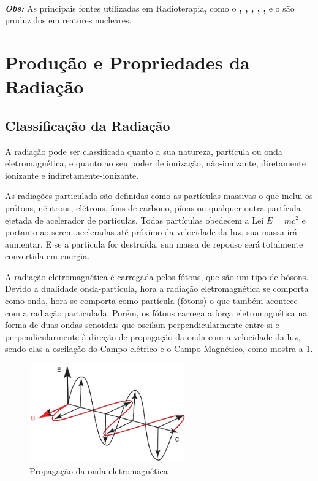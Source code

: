 \documentclass[11pt,a4paper]{article}
\begin{document}
                \

                \noindent \textbf{\textit{\textcolor{CarnationPink}{Obs:}}} As principais fontes utilizadas em Radioterapia, como o \textbf{, , , , , } e o \textbf{} são produzidos em reatores nucleares.  
    
    \section{Produção e Propriedades da Radiação}
        
        \subsection{Classificação da Radiação}

            A radiação pode ser classificada quanto a sua natureza, partícula ou onda eletromagnética, e quanto ao seu poder de ionização, não-ionizante, diretamente ionizante e indiretamente-ionizante.

            As radiações particulada são definidas como as partículas massivas o que inclui os prótons, nêutrons, elétrons, íons de carbono, píons ou qualquer outra partícula ejetada de acelerador de partículas. Todas partículas obedecem a Lei $E = mc^2$ e portanto ao serem aceleradas até próximo da velocidade da luz, sua massa irá aumentar. E se a partícula for destruída, sua massa de repouso será totalmente convertida em energia.

            A radiação eletromagnética é carregada pelos fótons, que são um tipo de bósons. Devido a dualidade onda-partícula, hora a radiação eletromagnética se comporta como onda, hora se comporta como partícula (fótons) o que também acontece com a radiação particulada. Porém, os fótons carrega a força eletromagnética na forma de duas ondas senoidais que oscilam perpendicularmente entre si e perpendicularmente à direção de propagação da onda com a velocidade da luz, sendo elas a oscilação do Campo elétrico e o Campo Magnético, como mostra a \ref{fig:ondaEletromagnetica}.

                    \begin{figure}[h]
                        \centering
                        \includegraphics[width=0.6\textwidth]{Imagens/ondaEletromagnetica.jpg}
                        \caption{Propagação da onda eletromagnética}
                        \label{fig:ondaEletromagnetica}
                    \end{figure}
            
\end{document}
